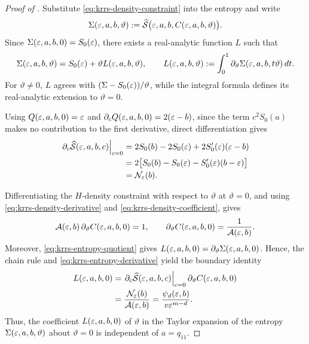 \begin{proof}[Proof of ]
Substitute \eqref{eq:krrs-density-constraint} into the entropy and write
\begin{equation}\label{eq:krrs-constrained-entropy}
  \Sigma(\varepsilon,a,b,\vartheta)
  :=\widehat{\mathcal S}
       \bigl(\varepsilon,a,b,C(\varepsilon,a,b,\vartheta)\bigr).
\end{equation}
Since \(\Sigma(\varepsilon,a,b,0)=S_0(\varepsilon)\), there exists a real-analytic function \(L\) such that
\begin{equation}\label{eq:krrs-entropy-quotient}
  \Sigma(\varepsilon,a,b,\vartheta)
  =S_0(\varepsilon)+\vartheta L(\varepsilon,a,b,\vartheta),
  \qquad
  L(\varepsilon,a,b,\vartheta)
  :=\int_0^1
     \partial_\vartheta\Sigma(\varepsilon,a,b,t\vartheta)\,dt.
\end{equation}
For \(\vartheta\ne0\), \(L\) agrees with
\((\Sigma-S_0(\varepsilon))/\vartheta\), while the integral formula defines its
real-analytic extension to \(\vartheta=0\).

Using \(Q(\varepsilon,a,b,0)=\varepsilon\) and
\(\partial_cQ(\varepsilon,a,b,0)=2(\varepsilon-b)\), since the term \(c^2S_0(a)\) makes no contribution to the first derivative, direct differentiation gives
\begin{equation}\label{eq:krrs-entropy-derivative}
  \begin{aligned}
  \left.\partial_c\widehat{\mathcal S}(\varepsilon,a,b,c)\right|_{c=0}
  &=2S_0(b)-2S_0(\varepsilon)+2S_0'(\varepsilon)(\varepsilon-b)\\
  &=2\bigl[S_0(b)-S_0(\varepsilon)-S_0'(\varepsilon)(b-\varepsilon)\bigr]\\
  &=\mathcal N_\varepsilon(b).
  \end{aligned}
\end{equation}

Differentiating the \(H\)-density constraint with respect to \(\vartheta\) at
\(\vartheta=0\), and using
\eqref{eq:krrs-density-derivative} and \eqref{eq:krrs-density-coefficient}, gives
\[
  \mathcal A(\varepsilon,b)\,\partial_\vartheta C(\varepsilon,a,b,0)=1,
  \qquad
  \partial_\vartheta C(\varepsilon,a,b,0)=\frac{1}{\mathcal A(\varepsilon,b)}.
\]
Moreover, \eqref{eq:krrs-entropy-quotient} gives
\(L(\varepsilon,a,b,0)=\partial_\vartheta\Sigma(\varepsilon,a,b,0)\).  Hence, the chain rule
and \eqref{eq:krrs-entropy-derivative} yield the boundary identity
\begin{equation}\label{eq:krrs-quotient-boundary}
  \begin{aligned}
  L(\varepsilon,a,b,0)
  &=\left.\partial_c\widehat{\mathcal S}(\varepsilon,a,b,c)\right|_{c=0}
    \partial_\vartheta C(\varepsilon,a,b,0)\\
  &=\frac{\mathcal N_\varepsilon(b)}{\mathcal A(\varepsilon,b)}
   =\frac{\psi_d(\varepsilon,b)}{v\varepsilon^{m-d}}.
  \end{aligned}
\end{equation}
Thus, the coefficient \(L(\varepsilon,a,b,0)\) of \(\vartheta\) in the Taylor
expansion of the entropy \(\Sigma(\varepsilon,a,b,\vartheta)\) about \(\vartheta=0\) is
independent of \(a=q_{11}\).


\end{proof}
